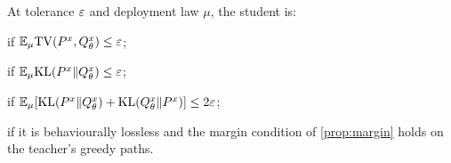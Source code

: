 \begin{definition}\label{def:hierarchy}
At tolerance $\varepsilon$ and deployment law $\mu$, the student is:
\begin{description}[nosep,font=\normalfont\itshape]
\item[behaviourally lossless] if $\mathbb{E}_\mu\mathrm{TV}(P^{x},Q^{x}_{\theta})\le\varepsilon$;
\item[likelihood lossless] if $\mathbb{E}_\mu\mathrm{KL}(P^{x}\|Q^{x}_{\theta})\le\varepsilon$;
\item[two-sided lossless] if $\mathbb{E}_\mu[\mathrm{KL}(P^{x}\|Q^{x}_{\theta})+\mathrm{KL}(Q^{x}_{\theta}\|P^{x})]\le2\varepsilon$;
\item[decoding lossless] if it is behaviourally lossless and the margin condition of
\cref{prop:margin} holds on the teacher's greedy paths.
\end{description}
\end{definition}

